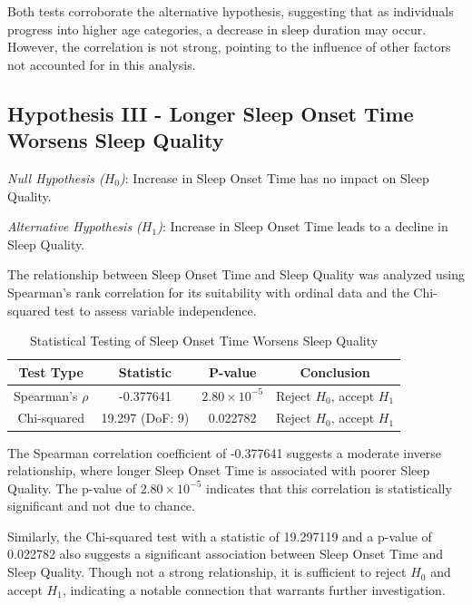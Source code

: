 \documentclass[conference]{IEEEtran}
\begin{document}
Both tests corroborate the alternative hypothesis, suggesting that as individuals progress into higher age categories, a decrease in sleep duration may occur. However, the correlation is not strong, pointing to the influence of other factors not accounted for in this analysis.


\subsection*{Hypothesis III - Longer Sleep Onset Time Worsens Sleep Quality}
\textit{Null Hypothesis (\(H_0\))}: Increase in Sleep Onset Time has no impact on Sleep Quality.

\textit{Alternative Hypothesis (\(H_1\))}: Increase in Sleep Onset Time leads to a decline in Sleep Quality.

The relationship between Sleep Onset Time and Sleep Quality was analyzed using Spearman's rank correlation for its suitability with ordinal data and the Chi-squared test to assess variable independence.

\begin{table}[ht]
    \centering
    \caption{Statistical Testing of Sleep Onset Time Worsens Sleep Quality}
    \label{tab:hypothesis3}
    \begin{tabular}{|c|c|c|c|}
        \hline
        \textbf{Test Type}  & \textbf{Statistic} & \textbf{P-value}        & \textbf{Conclusion}            \\
        \hline
        Spearman's \(\rho\) & -0.377641          & \(2.80 \times 10^{-5}\) & Reject \(H_0\), accept \(H_1\) \\
        \hline
        Chi-squared         & 19.297 (DoF: 9)    & 0.022782                & Reject \(H_0\), accept \(H_1\) \\
        \hline
    \end{tabular}
\end{table}

The Spearman correlation coefficient of -0.377641 suggests a moderate inverse relationship, where longer Sleep Onset Time is associated with poorer Sleep Quality. The p-value of \(2.80 \times 10^{-5}\) indicates that this correlation is statistically significant and not due to chance.

Similarly, the Chi-squared test with a statistic of 19.297119 and a p-value of 0.022782 also suggests a significant association between Sleep Onset Time and Sleep Quality. Though not a strong relationship, it is sufficient to reject \(H_0\) and accept \(H_1\), indicating a notable connection that warrants further investigation.
\end{document}
